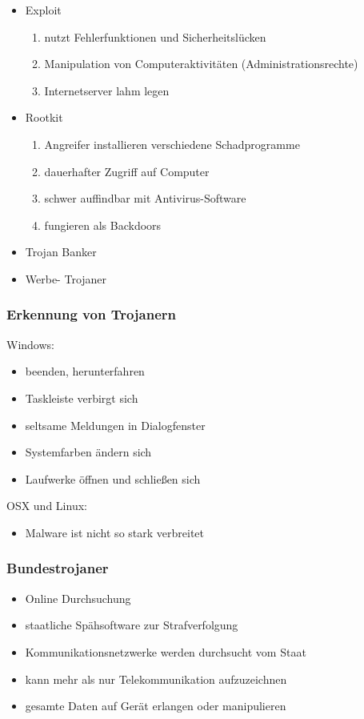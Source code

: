 \documentclass{beamer}
\begin{document}
\begin{frame}
	\begin{itemize}
		\item Exploit
			\begin{enumerate}
				\item nutzt Fehlerfunktionen und Sicherheitslücken
				\item Manipulation von Computeraktivitäten (Administrationsrechte)
				\item Internetserver lahm legen
			\end{enumerate}
		\item Rootkit
			\begin{enumerate}
				\item Angreifer installieren verschiedene Schadprogramme
				\item dauerhafter Zugriff auf Computer
				\item schwer auffindbar mit Antivirus-Software
				\item fungieren als Backdoors
			\end{enumerate}
		\item Trojan Banker
		\item Werbe- Trojaner
	\end{itemize}
\end{frame}

\begin{frame}
	\frametitle{Erkennung von Trojanern}
	Windows:
	\begin{itemize}
		\item beenden, herunterfahren
		\item Taskleiste verbirgt sich
		\item seltsame Meldungen in Dialogfenster
		\item Systemfarben ändern sich
		\item Laufwerke öffnen und schließen sich
	\end{itemize}
	OSX und Linux:
	\begin{itemize}
		\item Malware ist nicht so stark verbreitet
	\end{itemize}
\end{frame}


\begin{frame}
	\frametitle{Bundestrojaner}
	\begin{itemize}
		\item Online Durchsuchung
		\item staatliche Spähsoftware zur Strafverfolgung
		\item Kommunikationsnetzwerke werden durchsucht vom Staat
		\item kann mehr als nur Telekommunikation aufzuzeichnen
		\item gesamte Daten auf Gerät erlangen oder manipulieren
	\end{itemize}
\end{frame}
\end{document}
